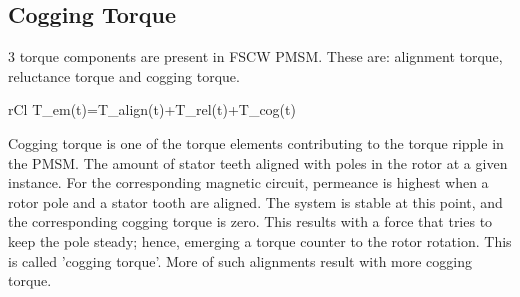 \documentclass [a4 paper, 11pt, titlepage] {article}
\begin{document}
	\subsection{Cogging Torque}
	3 torque components are present in FSCW PMSM. These are: alignment torque, reluctance torque and cogging torque.
	\begin{IEEEeqnarray*}{rCl}
		T_{em}(t)=T_{align}(t)+T_{rel}(t)+T_{cog}(t)
	\end{IEEEeqnarray*}
	Cogging torque is one of the torque elements contributing to the torque ripple in the PMSM. The amount of stator teeth aligned with poles in the rotor at a given instance. For the corresponding magnetic circuit, permeance is highest when a rotor pole and a stator tooth are aligned. The system is stable at this point, and the corresponding cogging torque is zero. This results with a force that tries to keep the pole steady; hence, emerging a torque counter to the rotor rotation. This is called 'cogging torque'. More of such alignments result with more cogging torque. 
\end{document}
